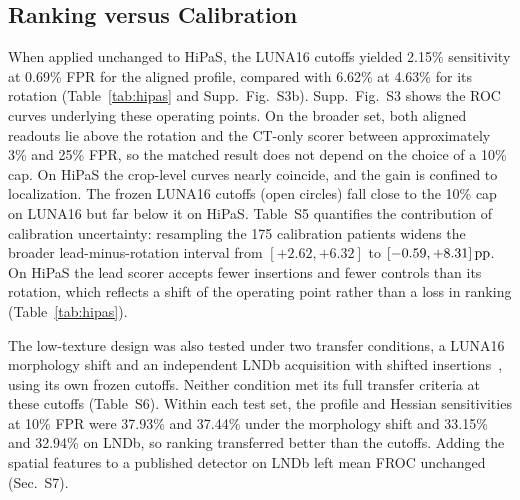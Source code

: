 \begin{table}[t]
\centering
\caption{Sensitivity (\%) on HiPaS native vessels (432 controls, 7,776 insertions) at the within-HiPaS 10\% FPR cap and at the frozen LUNA16 cutoffs.}
\label{tab:hipas}

\end{table}


\subsection{Ranking versus Calibration}
\label{sec:calibration}
When applied unchanged to HiPaS, the LUNA16 cutoffs yielded 2.15\% sensitivity at 0.69\% FPR for the aligned profile, compared with 6.62\% at 4.63\% for its rotation (Table~\ref{tab:hipas} and Supp.~Fig.~S3b). Supp.~Fig.~S3 shows the ROC curves underlying these operating points. On the broader set, both aligned readouts lie above the rotation and the CT-only scorer between approximately 3\% and 25\% FPR, so the matched result does not depend on the choice of a 10\% cap. On HiPaS the crop-level curves nearly coincide, and the gain is confined to localization. The frozen LUNA16 cutoffs (open circles) fall close to the 10\% cap on LUNA16 but far below it on HiPaS. Table~S5 quantifies the contribution of calibration uncertainty: resampling the 175 calibration patients widens the broader lead-minus-rotation interval from $[+2.62,+6.32]$ to $[-0.59,+8.31]\,\mathrm{pp}$. On HiPaS the lead scorer accepts fewer insertions and fewer controls than its rotation, which reflects a shift of the operating point rather than a loss in ranking (Table~\ref{tab:hipas}).

The low-texture design was also tested under two transfer conditions, a LUNA16 morphology shift and an independent LNDb acquisition with shifted insertions~\cite{pedrosa2021}, using its own frozen cutoffs. Neither condition met its full transfer criteria at these cutoffs (Table~S6). Within each test set, the profile and Hessian sensitivities at 10\% FPR were 37.93\% and 37.44\% under the morphology shift and 33.15\% and 32.94\% on LNDb, so ranking transferred better than the cutoffs. Adding the spatial features to a published detector on LNDb left mean FROC unchanged (Sec.~S7).






